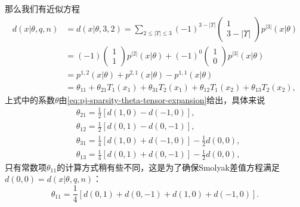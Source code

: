 那么我们有近似方程
\begin{equation*}
  \begin{split}
    d \left( x | \theta, q, n \right) & = d \left( x | \theta, 3, 2 \right)
    = \sum_{2 \le \left| \Upsilon \right| \le 3}
    \left( -1 \right)^{3 - \left| \Upsilon \right|}
    \begin{pmatrix}
      1 \\
      3 - \left| \Upsilon \right|
    \end{pmatrix}
    p^{\left| 3 \right| } \left( x | \theta \right) \\
    & = (-1)
    \begin{pmatrix}
      1 \\
      1
    \end{pmatrix}
    p^{\left| 2 \right|} \left( x | \theta \right)
    + \left( -1 \right)^{0}
    \begin{pmatrix}
      1 \\
      0
    \end{pmatrix}
    p^{\left| 3 \right|} \left( x | \theta \right) \\
    & = p^{1,2} \left( x | \theta \right) + p^{2,1} \left( x | \theta \right)
    -p^{1,1} \left( x | \theta \right) \\
    & = \theta_{11} + \theta_{21} T_{1} \left( x_{1} \right)
    + \theta_{31} T_{2} \left( x_{1} \right) + \theta_{12} T_{1} \left(x_{2} \right) + \theta_{13} T_{2} \left( x_{2} \right),
  \end{split}
\end{equation*}
上式中的系数$\theta$由\eqref{eq:pj-sparsity-theta-tensor-expansion}给出，具体来说
\begin{equation*}
  \begin{split}
    & \theta_{21} = \frac{1}{2}
    \left[
    d(1,0) - d(-1,0)
    \right], \\
    & \theta_{12} = \frac{1}{2}
    \left[
    d(0,1) - d(0,-1)
    \right], \\
    & \theta_{31} = \frac{1}{4}
    \left[
    d(1,0) + d(-1,0)
    \right]
    - \frac{1}{2} d(0,0), \\
    & \theta_{13} = \frac{1}{4}
    \left[
    d(0,1) + d(0,-1)
    \right]
    - \frac{1}{2} d(0,0),
  \end{split}
\end{equation*}
只有常数项$\theta_{11}$的计算方式稍有些不同，这是为了确保Smolyak差值方程满足$d(0,0) = d(x | \theta, q, n)$：
\begin{equation*}
  \theta_{11} = \frac{1}{4}
  \left[
  d(0,1) + d(0,-1) + d(1, 0) + d(-1,0)
  \right].
\end{equation*}

